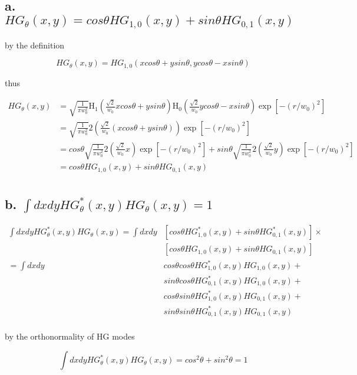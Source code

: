 \documentclass[12pt]{article}
\begin{document}
\begin{flushleft}
\subsection*{a. $HG_\theta(x, y) = cos\theta HG_{1,0}(x, y) + sin\theta HG_{0,1}(x, y)$}

by the definition

\[
    HG_\theta(x, y) = HG_{1,0}(x cos\theta + y sin\theta, y cos\theta - x sin\theta)
\]

thus

\begin{align*}
    HG_\theta(x, y) &= \sqrt{\frac{1}{\pi w_0^2}}\mathrm{H}_1(\frac{\sqrt{2}}{w_0}x cos\theta + y sin\theta)\mathrm{H}_0(\frac{\sqrt{2}}{w_0}y cos\theta - x sin\theta)\exp\left[-(r / w_0) ^ 2\right]\\
    &= \sqrt{\frac{1}{\pi w_0^2}}2(\frac{\sqrt{2}}{w_0}(x cos\theta + y sin\theta))\exp\left[-(r / w_0) ^ 2\right]\\
    &= cos\theta \sqrt{\frac{1}{\pi w_0^2}}2(\frac{\sqrt{2}}{w_0}x)\exp\left[-(r / w_0) ^ 2\right] +  sin\theta\sqrt{\frac{1}{\pi w_0^2}}2(\frac{\sqrt{2}}{w_0}y)\exp\left[-(r / w_0) ^ 2\right]\\
    &= cos\theta HG_{1,0}(x, y) +  sin\theta HG_{0,1}(x, y)\\
\end{align*}

\subsection*{b. $\int dxdy HG^*_\theta(x, y)HG_\theta(x, y) = 1$}

\begin{align*}
    \int dxdy HG^*_\theta(x, y)HG_\theta(x, y) = \int dxdy& \left[cos\theta HG^*_{1,0}(x, y) +  sin\theta HG^*_{0,1}(x, y)\right]\times\\&\left[cos\theta HG_{1,0}(x, y) + sin\theta HG_{0,1}(x, y)\right]\\
    = \int dxdy& cos\theta cos\theta HG^*_{1,0}(x, y)HG_{1,0}(x, y)  +\\
    &sin\theta cos\theta HG^*_{0,1}(x, y)HG_{1,0}(x, y) +\\
    &cos\theta sin\theta HG^*_{1,0}(x, y)HG_{0,1}(x, y) + \\
    &sin\theta sin\theta HG^*_{0,1}(x, y)HG_{0,1}(x, y)\\
\end{align*}

by the orthonormality of HG modes

\[
    \int dxdy HG^*_\theta(x, y)HG_\theta(x, y) = cos^2 \theta + sin^2 \theta = 1
\]


\end{flushleft}
\end{document}

